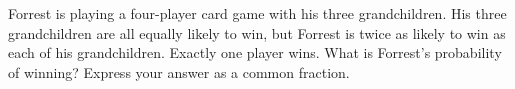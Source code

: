 Forrest is playing a four-player card game with his three grandchildren. His three grandchildren are all equally likely to win, but Forrest is twice as likely to win as each of his grandchildren. Exactly one player wins. What is Forrest's probability of winning? Express your answer as a common fraction.
